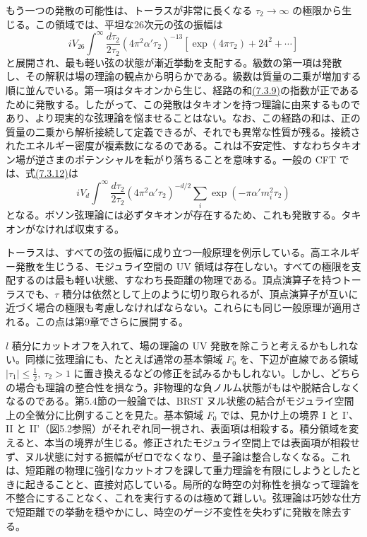 もう一つの発散の可能性は、トーラスが非常に長くなる $\tau_2\to\infty$ の極限から生じる。この領域では、平坦な26次元の弦の振幅は
\begin{equation}
iV_{26}\int^\infty\frac{d\tau_2}{2\tau_2}
(4\pi^2\alpha'\tau_2)^{-13}
\left[\exp(4\pi\tau_2)+24^2+\cdots\right]
\tag{7.3.15}\label{eq:7.3.15}
\end{equation}
と展開され、最も軽い弦の状態が漸近挙動を支配する。級数の第一項は発散し、その解釈は場の理論の観点から明らかである。級数は質量の二乗が増加する順に並んでいる。第一項はタキオンから生じ、経路の和\hyperref[eq:7.3.9]{(7.3.9)}の指数が正であるために発散する。したがって、この発散はタキオンを持つ理論に由来するものであり、より現実的な弦理論を悩ませることはない。なお、この経路の和は、正の質量の二乗から解析接続して定義できるが、それでも異常な性質が残る。接続されたエネルギー密度が複素数になるのである。これは不安定性、すなわちタキオン場が逆さまのポテンシャルを転がり落ちることを意味する。一般の CFT では、式\hyperref[eq:7.3.12]{(7.3.12)}は
\begin{equation}
iV_d\int^\infty\frac{d\tau_2}{2\tau_2}
(4\pi^2\alpha'\tau_2)^{-d/2}
\sum_i\exp(-\pi\alpha'm_i^2\tau_2)
\tag{7.3.16}\label{eq:7.3.16}
\end{equation}
となる。ボソン弦理論には必ずタキオンが存在するため、これも発散する。タキオンがなければ収束する。

トーラスは、すべての弦の振幅に成り立つ一般原理を例示している。高エネルギー発散を生じうる、モジュライ空間の UV 領域は存在しない。すべての極限を支配するのは最も軽い状態、すなわち長距離の物理である。頂点演算子を持つトーラスでも、$\tau$ 積分は依然として上のように切り取られるが、頂点演算子が互いに近づく場合の極限も考慮しなければならない。これらにも同じ一般原理が適用される。この点は第9章でさらに展開する。

$l$ 積分にカットオフを入れて、場の理論の UV 発散を除こうと考えるかもしれない。同様に弦理論にも、たとえば通常の基本領域 $F_0$ を、下辺が直線である領域 $|\tau_1|\leq\tfrac12,\ \tau_2>1$ に置き換えるなどの修正を試みるかもしれない。しかし、どちらの場合も理論の整合性を損なう。非物理的な負ノルム状態がもはや脱結合しなくなるのである。第5.4節の一般論では、BRST ヌル状態の結合がモジュライ空間上の全微分に比例することを見た。基本領域 $F_0$ では、見かけ上の境界 I と I'、II と II'（図5.2参照）がそれぞれ同一視され、表面項は相殺する。積分領域を変えると、本当の境界が生じる。修正されたモジュライ空間上では表面項が相殺せず、ヌル状態に対する振幅がゼロでなくなり、量子論は整合しなくなる。これは、短距離の物理に強引なカットオフを課して重力理論を有限にしようとしたときに起きることと、直接対応している。局所的な時空の対称性を損なって理論を不整合にすることなく、これを実行するのは極めて難しい。弦理論は巧妙な仕方で短距離での挙動を穏やかにし、時空のゲージ不変性を失わずに発散を除去する。

